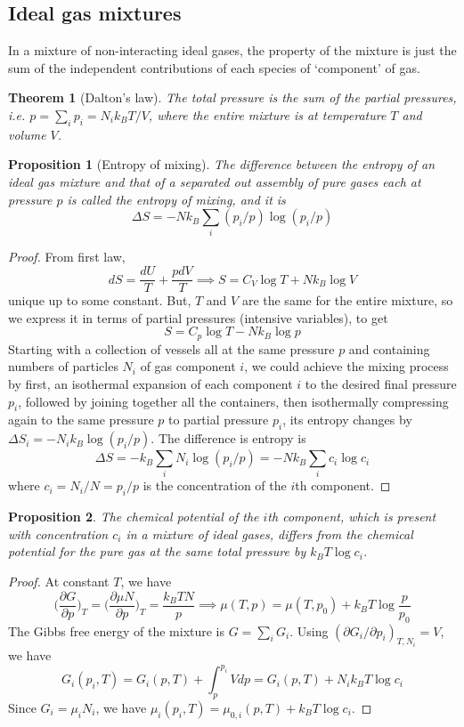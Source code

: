 \documentclass[a4paper]{article}
\theoremstyle{new}
\newtheorem{thm}{Theorem}[section]
\newtheorem{prop}{Proposition}[section]
\begin{document}
\subsection{Ideal gas mixtures}
In a mixture of non-interacting ideal gases, the property of the mixture is just the sum of the independent contributions of each species of `component' of gas. 
\begin{thm}[Dalton's law]
The total pressure is the sum of the partial pressures, i.e. $p=\sum_ip_i=N_ik_BT/V$, where the entire mixture is at temperature $T$ and volume $V$.
\end{thm}
\begin{prop}[Entropy of mixing]
The difference between the entropy of an ideal gas mixture and that of a separated out assembly of pure gases each at pressure $p$ is called the entropy of mixing, and it is
$$\Delta S=-Nk_B\sum_i(p_i/p)\log(p_i/p)$$
\end{prop}
\begin{proof}
From first law,
$$dS=\frac{dU}{T}+\frac{pdV}{T}\implies S=C_V\log T+Nk_B\log V$$
unique up to some constant. But, $T$ and $V$ are the same for the entire mixture, so we express it in terms of partial pressures (intensive variables), to get
$$S=C_p\log T-Nk_B\log p$$
Starting with a collection of vessels all at the same pressure $p$ and containing numbers of particles $N_i$ of gas component $i$, we could achieve the mixing process by first, an isothermal expansion of each component $i$ to the desired final pressure $p_i$, followed by joining together all the containers, then isothermally compressing again to the same pressure $p$ to partial pressure $p_i$, its entropy changes by $\Delta S_i=-N_ik_B\log(p_i/p)$. The difference is entropy is
$$\Delta S=-k_B\sum_iN_i\log(p_i/p)=-Nk_B\sum_ic_i\log c_i$$
where $c_i=N_i/N=p_i/p$ is the concentration of the $i$th component.
\end{proof}
\begin{prop}
The chemical potential of the $i$th component, which is present with concentration $c_i$ in a mixture of ideal gases, differs from the chemical potential for the pure gas at the same total pressure by $k_BT\log c_i$. 
\end{prop}
\begin{proof}
At constant $T$, we have
$$\bigg(\frac{\partial G}{\partial p}\bigg)_T=\bigg(\frac{\partial\mu N}{\partial p}\bigg)_T=\frac{k_BTN}{p}\implies\mu (T,p)=\mu(T,p_0)+k_BT\log\frac{p}{p_0}$$
The Gibbs free energy of the mixture is $G=\sum_iG_i$. Using $(\partial G_i/\partial p_i)_{T,N_i}=V$, we have
$$G_i(p_i,T)=G_i(p,T)+\int_p^{p_i}Vdp=G_i(p,T)+N_ik_BT\log c_i$$
Since $G_i=\mu_iN_i$, we have $\mu_i(p_i,T)=\mu_{0,i}(p,T)+k_BT\log c_i$. 
\end{proof}
\end{document}
